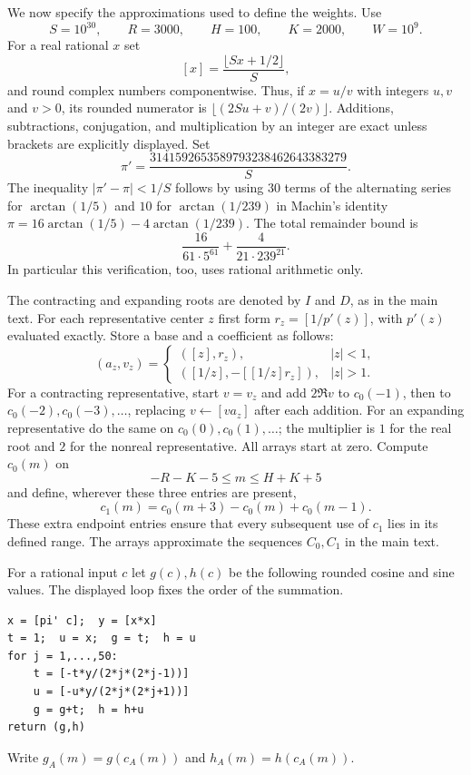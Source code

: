 We now specify the approximations used to define the weights.  Use
\[
 S=10^{30},\qquad R=3000,\qquad H=100,\qquad K=2000,
 \qquad W=10^9.
\]
For a real rational $x$ set
\[
 [x]=\frac{\lfloor Sx+1/2\rfloor}{S},
\]
and round complex numbers componentwise.  Thus, if $x=u/v$ with
integers $u,v$ and $v>0$, its rounded numerator is
$\lfloor(2Su+v)/(2v)\rfloor$.  Additions, subtractions, conjugation,
and multiplication by an integer are exact unless brackets are
explicitly displayed.  Set
\[
 \pi'=\frac{3141592653589793238462643383279}{S}.
\]
The inequality $|\pi'-\pi|<1/S$ follows by using $30$ terms of the
alternating series for $\arctan(1/5)$ and $10$ for $\arctan(1/239)$
in Machin's identity
$\pi=16\arctan(1/5)-4\arctan(1/239)$.  The total remainder bound is
\[
 \frac{16}{61\cdot5^{61}}+\frac4{21\cdot239^{21}}.
\]
In particular this verification, too, uses rational arithmetic only.

The contracting and expanding roots are denoted by $I$ and $D$, as in
the main text.  For each representative center $z$ first form
$r_z=[1/p'(z)]$, with $p'(z)$ evaluated exactly.  Store a base and a
coefficient as follows:
\begin{equation}\label{cert:base-pairs}
 (a_z,v_z)=
 \begin{cases}
 ([z],r_z),&|z|<1,\\
 ([1/z],-[[1/z]r_z]),&|z|>1.
 \end{cases}
\end{equation}
For a contracting representative, start $v=v_z$ and add $2\Re v$
to $c_0(-1)$, then to $c_0(-2),c_0(-3),\ldots$, replacing
$v\leftarrow[va_z]$ after each addition.  For an expanding
representative do the same on $c_0(0),c_0(1),\ldots$; the multiplier
is $1$ for the real root and $2$ for the nonreal representative.
All arrays start at zero.  Compute $c_0(m)$ on
\[
 -R-K-5\le m\le H+K+5
\]
and define, wherever these three entries are present,
\begin{equation}\label{cert:shift-array}
 c_1(m)=c_0(m+3)-c_0(m)+c_0(m-1).
\end{equation}
These extra endpoint entries ensure that every subsequent use of
$c_1$ lies in its defined range.  The arrays approximate the sequences
$C_0,C_1$ in the main text.

For a rational input $c$ let $g(c),h(c)$ be the following rounded
cosine and sine values.  The displayed loop fixes the order of the
summation.
\begin{verbatim}
x = [pi' c];  y = [x*x]
t = 1;  u = x;  g = t;  h = u
for j = 1,...,50:
    t = [-t*y/(2*j*(2*j-1))]
    u = [-u*y/(2*j*(2*j+1))]
    g = g+t;  h = h+u
return (g,h)
\end{verbatim}
Write $g_A(m)=g(c_A(m))$ and $h_A(m)=h(c_A(m))$.

